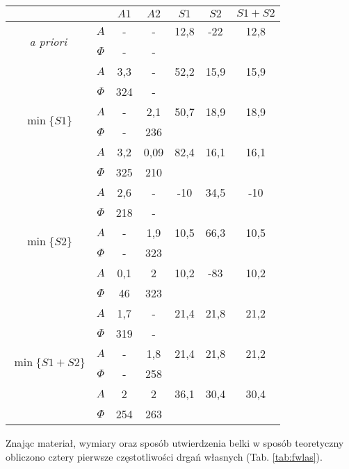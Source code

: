 \documentclass[polish,a4paper,11pt]{mwart}
\begin{document}
  \begin{table}[!tbh]
    \centering
    \begin{tabular}{|c|c|c|c|c|c|c|}
      \cline{3-7}
      \multicolumn{2}{c|}{}&$A1$&$A2$&$S1$&$S2$&$S1+S2$\\\hline
      \multirow{2}{*}{\textit{a priori}} & $A$ & - & - & 12,8 & -22 & 12,8\\\cline{2-7}
					 & $\Phi$ & - & - & \multicolumn{3}{c}{}\\\hline
      \multirow{6}{*}{$\min\{S1\}$}   &   $A$ & 3,3 & - & 52,2 & 15,9 & 15,9\\\cline{2-7}
				      &$\Phi$ & 324 & - & \multicolumn{3}{c}{}\\\cline{2-7}
				      &   $A$ & - & 2,1 & 50,7 & 18,9 & 18,9\\\cline{2-7}
				      &$\Phi$ & - & 236 & \multicolumn{3}{c}{}\\\cline{2-7}
				      &   $A$ & 3,2 & 0,09 & 82,4 & 16,1 & 16,1\\\cline{2-7}
				      &$\Phi$ & 325 & 210 & \multicolumn{3}{c}{}\\\hline
      \multirow{6}{*}{$\min\{S2\}$}   &   $A$ & 2,6 & - & -10 & 34,5 & -10\\\cline{2-7}
				      &$\Phi$ & 218 & - & \multicolumn{3}{c}{}\\\cline{2-7}
				      &   $A$ & - & 1,9 & 10,5 & 66,3 & 10,5\\\cline{2-7}
				      &$\Phi$ & - & 323 & \multicolumn{3}{c}{}\\\cline{2-7}
				      &   $A$ & 0,1 & 2 & 10,2 & -83 & 10,2\\\cline{2-7}
				      &$\Phi$ & 46 & 323 & \multicolumn{3}{c}{}\\\hline
      \multirow{6}{*}{$\min\{S1+S2\}$}&   $A$ & 1,7 & - & 21,4 & 21,8 & 21,2\\\cline{2-7}
				      &$\Phi$ & 319 & - & \multicolumn{3}{c}{}\\\cline{2-7}
				      &   $A$ & - & 1,8 & 21,4 & 21,8 & 21,2\\\cline{2-7}
				      &$\Phi$ & - & 258 & \multicolumn{3}{c}{}\\\cline{2-7}
				      &   $A$ & 2 & 2 & 36,1 & 30,4 & 30,4\\\cline{2-7}
				      &$\Phi$ & 254 & 263 & \multicolumn{3}{c}{}\\\cline{1-4}
    \end{tabular}
  \end{table}

  Znając materiał, wymiary oraz sposób utwierdzenia belki w sposób teoretyczny obliczono
  cztery pierwsze częstotliwości drgań własnych (Tab. \ref{tab:fwlas}).
\end{document}
